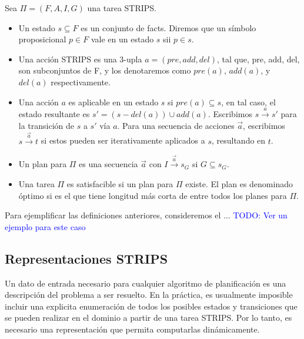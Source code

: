 \begin{mydef}
    Sea $\Pi = (F, A, I, G)$ una tarea STRIPS.
    
    \begin{itemize}
        \item Un estado $s \subseteq F$ es un conjunto de facts. Diremos que un
        símbolo proposicional $p \in F$ vale en un estado $s$ sii $p \in s$.
        
        \item Una acción STRIPS es una 3-upla $a = (pre, add, del)$, tal que,
        pre, add, del, son subconjuntos de F, y los denotaremos como $pre(a)$,
        $add(a)$, y $del(a)$ respectivamente.

        \item Una acción $a$ es aplicable en un estado $s$ si $pre(a) \subseteq
        s$, en tal caso, el estado resultante es $s' = (s - del(a)) \cup
        add(a)$. Escribimos $s \xrightarrow{a} s'$ para la transición de $s$ a
        $s'$ vía $a$. Para una secuencia de acciones $\vec{a}$, escribimos $s
        \xrightarrow{\vec{a}} t$ si estos pueden ser iterativamente aplicados a
        $s$, resultando en $t$.

        \item Un plan para $\Pi$ es una secuencia $\vec{a}$ con $I
        \xrightarrow{\vec{a}} s_G$ si $G \subseteq s_G$.
        
        \item Una tarea $\Pi$ es satisfacible si un plan para $\Pi$ existe. El
        plan es denominado óptimo si es el que tiene longitud más corta de entre
        todos los planes para $\Pi$.
    \end{itemize}
\end{mydef}

Para ejemplificar las definiciones anteriores, consideremos el ...
\textcolor{blue}{TODO: Ver un ejemplo para este caso}

\subsection{Representaciones STRIPS}

Un dato de entrada necesario para cualquier algoritmo de planificación es una
descripción del problema a ser resuelto. En la práctica, es usualmente imposible
incluir una explicita enumeración de todos los posibles estados y transiciones
que se pueden realizar en el dominio a partir de una tarea STRIPS. Por lo tanto,
es necesario una representación que permita computarlas dinámicamente.

